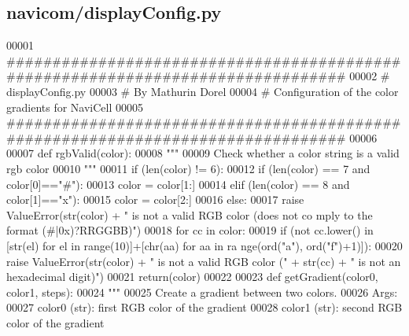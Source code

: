 \hypertarget{displayConfig_8py_source}{
\subsection{navicom/displayConfig.py}
}

\begin{DoxyCode}
00001 \textcolor{comment}{################################################################################}
00002 \textcolor{comment}{# displayConfig.py}
00003 \textcolor{comment}{# By Mathurin Dorel}
00004 \textcolor{comment}{# Configuration of the color gradients for NaviCell}
00005 \textcolor{comment}{################################################################################}
00006 
00007 \textcolor{keyword}{def }rgbValid(color):
00008     \textcolor{stringliteral}{"""}
00009 \textcolor{stringliteral}{    Check whether a color string is a valid rgb color}
00010 \textcolor{stringliteral}{    """}
00011     \textcolor{keywordflow}{if} (len(color) != 6):
00012         \textcolor{keywordflow}{if} (len(color) == 7 \textcolor{keywordflow}{and} color[0]==\textcolor{stringliteral}{"#"}):
00013             color = color[1:]
00014         \textcolor{keywordflow}{elif} (len(color) == 8 \textcolor{keywordflow}{and} color[1]==\textcolor{stringliteral}{"x"}):
00015             color = color[2:]
00016         \textcolor{keywordflow}{else}:
00017             \textcolor{keywordflow}{raise} ValueError(str(color) + \textcolor{stringliteral}{" is not a valid RGB color (does not co
      mply to the format (#|0x)?RRGGBB)"})
00018     \textcolor{keywordflow}{for} cc \textcolor{keywordflow}{in} color:
00019         \textcolor{keywordflow}{if} (\textcolor{keywordflow}{not} cc.lower() \textcolor{keywordflow}{in} [str(el) \textcolor{keywordflow}{for} el \textcolor{keywordflow}{in} range(10)]+[chr(aa) \textcolor{keywordflow}{for} aa \textcolor{keywordflow}{in} ra
      nge(ord(\textcolor{stringliteral}{"a"}), ord(\textcolor{stringliteral}{"f"})+1)]):
00020             \textcolor{keywordflow}{raise} ValueError(str(color) + \textcolor{stringliteral}{" is not a valid RGB color ("} + str(cc)
       + \textcolor{stringliteral}{" is not an hexadecimal digit)"})
00021     \textcolor{keywordflow}{return}(color)
00022 
00023 \textcolor{keyword}{def }getGradient(color0, color1, steps):
00024     \textcolor{stringliteral}{"""}
00025 \textcolor{stringliteral}{    Create a gradient between two colors.}
00026 \textcolor{stringliteral}{    Args:}
00027 \textcolor{stringliteral}{        color0 (str): first RGB color of the gradient}
00028 \textcolor{stringliteral}{        color1 (str): second RGB color of the gradient}

\end{DoxyCode}
